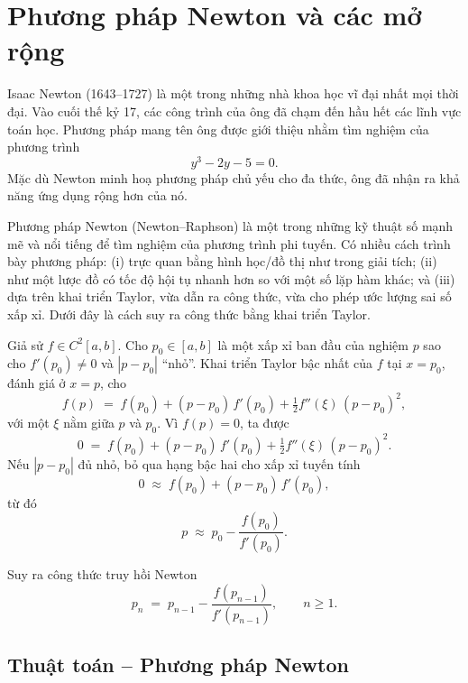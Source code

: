 \section{Phương pháp Newton và các mở rộng}

Isaac Newton (1643–1727) là một trong những nhà khoa học vĩ đại nhất mọi thời đại. 
Vào cuối thế kỷ 17, các công trình của ông đã chạm đến hầu hết các lĩnh vực toán học. 
Phương pháp mang tên ông được giới thiệu nhằm tìm nghiệm của phương trình
\[
y^3 - 2y - 5 = 0.
\]
Mặc dù Newton minh hoạ phương pháp chủ yếu cho đa thức, ông đã nhận ra khả năng ứng dụng rộng hơn của nó.

Phương pháp Newton (Newton--Raphson) là một trong những kỹ thuật số mạnh mẽ và nổi tiếng để tìm nghiệm của phương trình phi tuyến. 
Có nhiều cách trình bày phương pháp: (i) trực quan bằng hình học/đồ thị như trong giải tích; 
(ii) như một lược đồ có tốc độ hội tụ nhanh hơn so với một số lặp hàm khác; 
và (iii) dựa trên khai triển Taylor, vừa dẫn ra công thức, vừa cho phép ước lượng sai số xấp xỉ. 
Dưới đây là cách suy ra công thức bằng khai triển Taylor.

Giả sử $f \in C^2[a,b]$. Cho $p_0 \in [a,b]$ là một xấp xỉ ban đầu của nghiệm $p$ sao cho $f'(p_0) \neq 0$ và $|p - p_0|$ ``nhỏ''. 
Khai triển Taylor bậc nhất của $f$ tại $x=p_0$, đánh giá ở $x=p$, cho
\[
f(p) \;=\; f(p_0) + (p - p_0)\,f'(p_0) + \tfrac{1}{2} f''(\xi)\,(p - p_0)^2,
\]
với một $\xi$ nằm giữa $p$ và $p_0$. 
Vì $f(p)=0$, ta được
\[
0 \;=\; f(p_0) + (p - p_0)\,f'(p_0) + \tfrac{1}{2} f''(\xi)\,(p - p_0)^2.
\]
Nếu $|p - p_0|$ đủ nhỏ, bỏ qua hạng bậc hai cho xấp xỉ tuyến tính
\[
0 \;\approx\; f(p_0) + (p - p_0)\,f'(p_0),
\]
từ đó
\[
p \;\approx\; p_0 - \frac{f(p_0)}{f'(p_0)}.
\]

Suy ra công thức truy hồi Newton
\[
p_{n} \;=\; p_{n-1} - \frac{f(p_{n-1})}{f'(p_{n-1})}, \qquad n \ge 1. \tag{2.7}
\]


\subsection*{\textbf{Thuật toán – Phương pháp Newton}}

